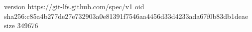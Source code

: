 version https://git-lfs.github.com/spec/v1
oid sha256:c85a4b277de27e732903a0e81391f7546aa4456d33d4233ada67f0b83db1deae
size 349676
